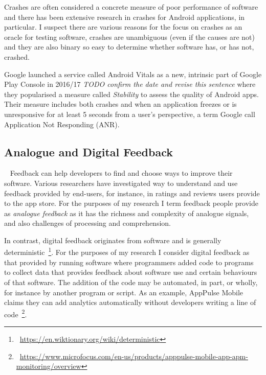 Crashes are often considered a concrete measure of poor performance of software and there has been extensive research in crashes for Android applications, in particular. I suspect there are various reasons for the focus on crashes as an oracle for testing software, crashes are unambiguous (even if the causes are not) and they are also binary so easy to determine whether software has, or has not, crashed. 

Google launched a service called Android Vitals as a new, intrinsic part of Google Play Console in 2016/17 \emph{TODO confirm the date and revise this sentence} where they popularised a measure called \emph{Stability} to assess the quality of Android apps. Their measure includes both crashes and when an application freezes or is unresponsive for at least 5 seconds from a user's perspective, a term Google call Application Not Responding (ANR).

\subsection{Analogue and Digital Feedback}~\label{analogue-and-digital-feedback}
Feedback can help developers to find and choose ways to improve their software. Various researchers have investigated way to understand and use feedback provided by end-users, for instance, in ratings and reviews users provide to the app store. For the purposes of my research I term feedback people provide as \emph{analogue feedback} as it has the richness and complexity of analogue signals, and also challenges of processing and comprehension.

In contrast, digital feedback originates from software and is generally deterministic~\footnote{~\url{https://en.wiktionary.org/wiki/deterministic}}. For the purposes of my research I consider digital feedback as that provided by running software where programmers added code to programs to collect data that provides feedback about software use and certain behaviours of that software. The addition of the code may be automated, in part, or wholly, for instance by another program or script. As an example, AppPulse Mobile claims they can add analytics automatically without developers writing a line of code~\footnote{~\url{https://www.microfocus.com/en-us/products/apppulse-mobile-app-apm-monitoring/overview}}.



